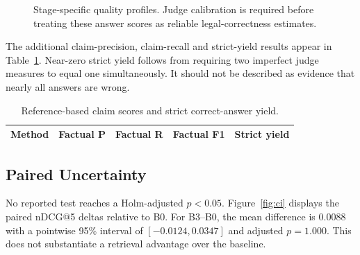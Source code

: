 \begin{figure}[H]\centering
{}
\caption{Stage-specific quality profiles. Judge calibration is required before treating these answer scores as reliable legal-correctness estimates.}\label{fig:quality}
\end{figure}

The additional claim-precision, claim-recall and strict-yield results appear in Table~\ref{tab:factual}. Near-zero strict yield follows from requiring two imperfect judge measures to equal one simultaneously. It should not be described as evidence that nearly all answers are wrong.

\begin{table}[H]\centering\small
\caption{Reference-based claim scores and strict correct-answer yield.}\label{tab:factual}
\begin{tabular}{lrrrr}\toprule
\textbf{Method} & \textbf{Factual P} & \textbf{Factual R} & \textbf{Factual F1} & \textbf{Strict yield}\\\midrule

\bottomrule\end{tabular}
\end{table}

\subsection{Paired Uncertainty}
No reported test reaches a Holm-adjusted $p<0.05$. Figure~\ref{fig:ci} displays the paired nDCG@5 deltas relative to B0. For B3--B0, the mean difference is 0.0088 with a pointwise 95\% interval of $[-0.0124,0.0347]$ and adjusted $p=1.000$. This does not substantiate a retrieval advantage over the baseline.

